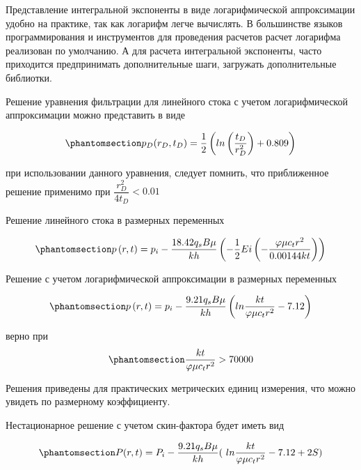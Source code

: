 \documentclass[
  russian,
  letterpaper,
  DIV=11,
  numbers=noendperiod,
  oneside]{scrartcl}
\begin{document}
Представление интегральной экспоненты в виде логарифмической
аппроксимации удобно на практике, так как логарифм легче вычислять. В
большинстве языков программирования и инструментов для проведения
расчетов расчет логарифма реализован по умолчанию. А для расчета
интегральной экспоненты, часто приходится предпринимать дополнительные
шаги, загружать дополнительные библиотки.

Решение уравнения фильтрации для линейного стока с учетом
логарифмической аппроксимации можно представить в виде

\begin{equation}\phantomsection\label{eq-ln_solution_d}{
p_D(r_D,t_D) = \frac{1}{2} \left( ln \left( \dfrac{ t_D }{r_D^2}  \right) +0.809 \right) 
}\end{equation}

при использовании данного уравнения, следует помнить, что приближенное
решение применимо при \(\dfrac{r_D^2}{4t_D} < 0.01\)

Решение линейного стока в размерных переменных

\begin{equation}\phantomsection\label{eq-ln_solution}{
p\left(r,t\right)=p_i-\frac{18.42q_sB\mu}{kh}\left(-\frac{1}{2}Ei\left(-\frac{\varphi\mu c_tr^2}{0.00144kt}\right)\right) 
}\end{equation}

Решение с учетом логарифмической аппроксимации в размерных переменных

\begin{equation}\phantomsection\label{eq-ei_solution_full}{
p\left(r,t\right)=p_i-\frac{9.21q_sB\mu}{kh}\left(ln{\frac{kt}{\varphi\mu c_tr^2}}-7.12\right)
}\end{equation}

верно при \begin{equation}\phantomsection\label{eq-eq_sol_condition}{
\frac{kt}{\varphi\mu c_tr^2}>70000 
}\end{equation}

Решения приведены для практических метрических единиц измерения, что
можно увидеть по размерному коэффициенту.

Нестационарное решение с учетом скин-фактора будет иметь вид

\begin{equation}\phantomsection\label{eq-ln_solution_2}{ 
P(r, t) = P_{i} - \frac {9.21 {q_s} B\mu }{k h}(\ ln\frac {k t}{ \varphi \mu {c_t} {r^2}} -7.12 + 2S) 
}\end{equation}
\end{document}
